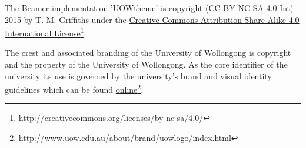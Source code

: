 \documentclass[aspectratio=169]{beamer}
\begin{document}
\begin{frame}\footnotesize
   The Beamer implementation 'UOWtheme' is copyright (CC BY-NC-SA 4.0 Int) 2015 by T. M. Griffiths under the \href{http://creativecommons.org/licenses/by-sa/4.0/}{Creative Commons Attribution-Share Alike 4.0 International License}\footnote{\url{http://creativecommons.org/licenses/by-nc-sa/4.0/}}.
   
   \begin{center}\ccbysa\end{center}
   
   The crest and associated branding of the University of Wollongong is copyright and the property of the University of Wollongong. As the core identifier of the university its use is governed by the university's brand and visual identity guidelines which can be found \href{http://www.uow.edu.au/about/brand/uowlogo/index.html}{online}\footnote{\url{http://www.uow.edu.au/about/brand/uowlogo/index.html}}.
   
\end{frame}
\end{document}
